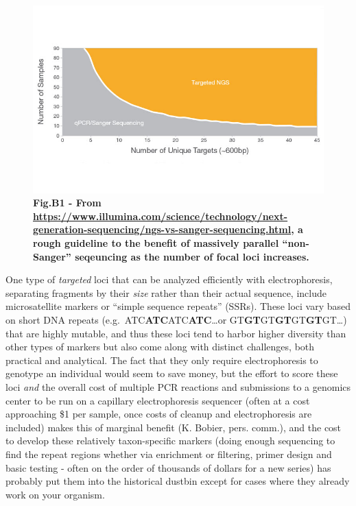 \documentclass[
]{article}
\begin{document}
\begin{figure}
\centering
\includegraphics{MEImages/cost-effectiveness-of-targeted-ngs.jpg}
\caption{\textbf{Fig.B1 - From
\url{https://www.illumina.com/science/technology/next-generation-sequencing/ngs-vs-sanger-sequencing.html},
a rough guideline to the benefit of massively parallel ``non-Sanger''
seqeuncing as the number of focal loci increases.}}
\end{figure}

One type of \emph{targeted} loci that can be analyzed efficiently with
electrophoresis, separating fragments by their \emph{size} rather than
their actual sequence, include microsatellite markers or ``simple
sequence repeats'' (SSRs). These loci vary based on short DNA repeats
(e.g.~ATC\textbf{ATC}ATC\textbf{ATC}\ldots or
GT\textbf{GT}GT\textbf{GT}GT\textbf{GT}GT\ldots) that are highly
mutable, and thus these loci tend to harbor higher diversity than other
types of markers but also come along with distinct challenges, both
practical and analytical. The fact that they only require
electrophoresis to genotype an individual would seem to save money, but
the effort to score these loci \emph{and} the overall cost of multiple
PCR reactions and submissions to a genomics center to be run on a
capillary electrophoresis sequencer (often at a cost approaching \$1 per
sample, once costs of cleanup and electrophoresis are included) makes
this of marginal benefit (K. Bobier, pers. comm.), and the cost to
develop these relatively taxon-specific markers (doing enough sequencing
to find the repeat regions whether via enrichment or filtering, primer
design and basic testing - often on the order of thousands of dollars
for a new series) has probably put them into the historical dustbin
except for cases where they already work on your organism.
\end{document}
